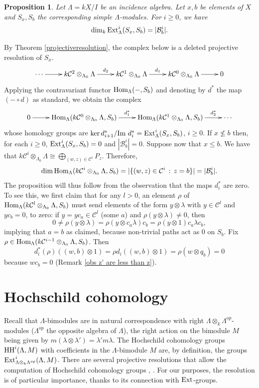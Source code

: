 \documentclass[preprint,review,12pt]{elsarticle}
\newcommand{\Hom}{{\textnormal{Hom}}}
\newcommand{\Ext}{{\textnormal{Ext}}}
\newcommand{\im}{{\textnormal{Im }}}
\newcommand{\HH}{{\textnormal{HH}}}
\newcommand{\C}{{\mathcal C}}
\newcommand{\B}{{\mathcal B}}
\newtheorem{prop}[teo]{Proposition}
\begin{document}
\begin{prop}\label{extgroups}
Let $\Lambda=kX/I$ be an incidence algebra. Let $x,b$ be elements of $X$ and $S_x,S_b$ the corresponding simple $\Lambda$-modules.  For $i\geqslant 0$, we have
	$$\dim_k\Ext_{\Lambda}^i(S_x,S_b) = |\B^{i}_b|.$$
\end{prop}
\begin{pf}
By Theorem \ref{projectiveresolution}, the complex below is a deleted projective resolution of $S_x$.
	$$\xymatrix@R=0.8em{ \cdots \ar[r] & k\C^2\otimes_{\Lambda_0}\Lambda\ar[r]^-{d_2} & k\C^{1}\otimes_{\Lambda_0}\Lambda\ar[r]^-{d_{1}} & k\C^{0}\otimes_{\Lambda_0}\Lambda\ar[r] & 0}$$ 	
Applying the contravariant functor $\Hom_{\Lambda}(-,S_b)$ and denoting by $d^*$ the map $(-\circ d)$ as standard, we obtain the complex
	$$\xymatrix@R=0.8em{ 0 \ar[r]& \Hom_{\Lambda}(k\C^{0}\otimes_{\Lambda_0}\Lambda,S_b) \ar[r]^-{d_{1}^*} & \Hom_{\Lambda}(k\C^{1}\otimes_{\Lambda_0}\Lambda,S_b) \ar[r]^-{d_{2}^*} & \cdots } $$
whose homology groups are $\ker d_{i+1}^*/\im d_{i}^* = \Ext_{\Lambda}^i(S_x,S_b)$, $i\geqslant 0$.  If $x\not\leqslant b$ then, for each $i\geqslant 0$, $\Ext_{\Lambda}^i(S_x,S_b) = 0$ and $|\B^{i}_b|=0$. Suppose now that $x\leqslant b$. We have that $k\C^i\otimes_{\Lambda_0}\Lambda\cong \bigoplus_{(w,z)\in \C^i} P_z$. Therefore, 
	$$\dim\Hom_{\Lambda}(k\C^{i}\otimes_{\Lambda_0}\Lambda,S_b) = |\{(w,z)\in \C^i\,:\,z=b\}| = |\B^i_b|.$$ 
The proposition will thus follow from the observation that the maps $d_i^*$ are zero.  To see this, we first claim that for any $l>0$, an element $\rho$ of $\Hom_{\Lambda}(k\C^{l}\otimes_{\Lambda_0}\Lambda,S_b)$ must send elements of the form $y\otimes \lambda$ with $y\in \C^l$ and $yc_b=0$, to zero: if $y = yc_a\in \mathcal{C}^l$ (some $a$) and $\rho(y\otimes \lambda)\neq 0$, then
$$0 \neq \rho (y\otimes \lambda) = \rho (y\otimes c_a\lambda)c_b = \rho(y\otimes 1)c_a\lambda c_b,$$
implying that $a = b$ as claimed, because non-trivial paths act as $0$ on $S_b$.  Fix $\rho\in \Hom_{\Lambda}(k\C^{i-1}\otimes_{\Lambda_0}\Lambda,S_b)$.  Then 
	$$d_i^*(\rho)((w,b)\otimes 1)=\rho d_i((w,b)\otimes 1) = \rho(w\otimes q_b) = 0$$
because $wc_b=0$ (Remark \ref{obs z' are less than z}).
\end{pf}
	
\section{Hochschild cohomology}
Recall that $\Lambda$-bimodules are in natural correspondence with right $\Lambda\otimes_k \Lambda^{op}$-modules ($\Lambda^{op}$ the opposite algebra of $\Lambda$), the right action on the bimodule $M$ being given by $m(\lambda\otimes \lambda') = \lambda'm\lambda$. The Hochschild cohomology groups $\HH^i(\Lambda, M)$ with coefficients in the $\Lambda$-bimodule $M$ are, by definition, the groups $\Ext_{\Lambda\otimes_k \Lambda^{op}}^i(\Lambda,M)$. There are several projective resolutions that allow the computation of Hochschild cohomology groups \cite[Section 1.5]{H89}, \cite[Section 2]{Hoc45}. For our purposes, the resolution \cite[Lemma 1.1]{C89} is of particular importance, thanks to its connection with $\Ext$-groups.
	
\end{document}
